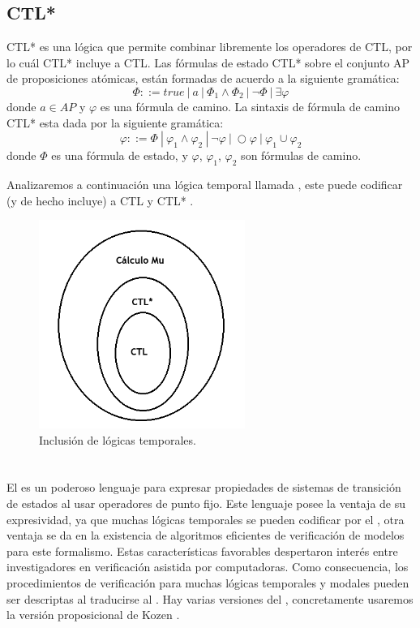 \subsection{CTL*}

\noindent CTL* es una lógica que permite combinar libremente los operadores de CTL, por lo cuál CTL* incluye a CTL. Las fórmulas de estado CTL* sobre el conjunto AP de proposiciones atómicas, están formadas de acuerdo a la siguiente gramática\cite{Baier:2}:
\[\Phi ::= true\ |\ a\ |\ \Phi_{1} \land \Phi_{2}\ |\ \neg \Phi\ |\ \exists \varphi \]
donde $a \in AP$ y $\varphi$ es una fórmula de camino. La sintaxis de fórmula de camino CTL* esta dada por la siguiente gramática:
\[\varphi ::= \Phi\ |\ \varphi_{1} \land \varphi_{2}\ |\ \neg \varphi\ |\ \bigcirc \varphi\ |\ \varphi_{1} \cup \varphi_{2} \]
donde $\Phi$ es una fórmula de estado, y $\varphi$, $\varphi_{1}$, $\varphi_{2}$ son fórmulas de camino.

\noindent Analizaremos a continuación una lógica temporal llamada {\mucalculo}, este puede codificar (y de hecho incluye) a CTL y CTL* \cite{Emerson:16}.

\begin{figure}[H]
  \centering
  \includegraphics[width=0.6\textwidth]{Figures/inclusiontemplogic.png}
  \caption{Inclusión de lógicas temporales.} 
  \label{fig:templogics}
\end{figure}


\section{{\mucalculo}}

\noindent El {\mucalculo} es un poderoso lenguaje para expresar propiedades de sistemas de transición de estados al usar operadores de punto fijo. Este lenguaje posee la ventaja de su expresividad, ya que muchas lógicas temporales se pueden codificar por el {\mucalculo}, otra ventaja se da en la existencia de algoritmos eficientes de verificación de modelos para este formalismo. Estas características favorables despertaron interés entre investigadores en verificación asistida por computadoras. Como consecuencia, los procedimientos de verificación para muchas lógicas temporales y modales pueden ser descriptas al traducirse al {\mucalculo}. Hay varias versiones del {\mucalculo}, concretamente usaremos la versión proposicional de Kozen\cite{Kozen:3} \cite{Clarke:1}.

